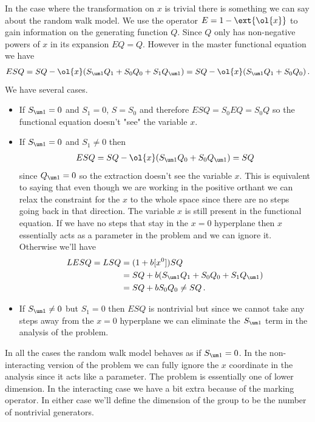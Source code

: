 In the case where the transformation on $x$ is trivial there is something we can say about the random walk model. We use the operator $E = 1 - \ext{\ol{x}}$ to gain information on the generating function $Q$. Since $Q$ only has non-negative powers of $x$ in its expansion $EQ = Q$. However in the master functional equation we have
\begin{align}
	ESQ = SQ - \ol{x}(S_{\um 1}Q_1 + S_0 Q_0 + S_1 Q_{\um 1})= SQ - \ol{x}(S_{\um 1}Q_1 + S_0 Q_0)\,.
\end{align}
We have several cases.
\begin{itemize}
\item[1)] If $S_{\um 1} = 0$ and $S_1 = 0$, $S = S_0$ and therefore $ESQ = S_0EQ = S_0Q$ so the functional equation doesn't "see" the variable $x$.
\item[2)] If $S_{\um 1} = 0$ and $S_1 \neq 0$ then
\begin{align}
	ESQ = SQ - \ol{x}(S_{\um 1}Q_0 + S_0 Q_{\um 1}) = SQ
\end{align}
since $Q_{\um 1} = 0$ so the extraction doesn't see the variable $x$. This is equivalent to saying that even though we are working in the positive orthant we can relax the constraint for the $x$ to the whole space since there are no steps going back in that direction. The variable $x$ is still present in the functional equation. If we have no steps that stay in the $x = 0$ hyperplane then $x$ essentially acts as a parameter in the problem and we can ignore it. Otherwise we'll have
\begin{align}\begin{split}
	LESQ = LSQ &= (1+b[x^0])SQ \\&= SQ + b(S_{\um 1}Q_1+S_0Q_0+S_1Q_{\um 1}) \\&= SQ + bS_0Q_0 \neq SQ\,.
\end{split}\end{align}
\item[3)] If $S_{\um 1}\neq 0$ but $S_1 = 0$ then $ESQ$ is nontrivial but since we cannot take any steps away from the $x = 0$ hyperplane we can eliminate the $S_{\um 1}$ term in the analysis of the problem.
\end{itemize}
In all the cases the random walk model behaves as if $S_{\um 1} = 0$. In the non-interacting version of the problem we can fully ignore the $x$ coordinate in the analysis since it acts like a parameter. The problem is essentially one of lower dimension. In the interacting case we have a bit extra because of the marking operator. In either case we'll define the dimension of the group to be the number of nontrivial generators.

